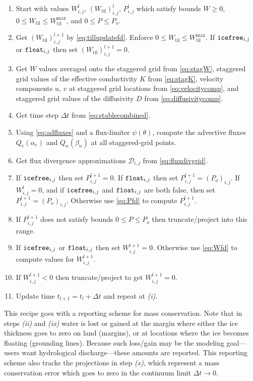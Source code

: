 \documentclass[gmd]{copernicus}   %
\newcommand{\text}{\textrm}
\newcommand{\Wtil}{W_{\text{til}}}
\newcommand{\Wtilmax}{W_{\text{til}}^{\text{max}}}
\newcommand{\Wlij}{W^l_{i,j}}
\newcommand{\Plij}{P^l_{i,j}}
\begin{document}
\renewcommand{\labelenumi}{\emph{(\roman{enumi})}}
\begin{enumerate}
\item Start with values $\Wlij$, $(\Wtil)_{i,j}^l$, $\Plij$ which satisfy bounds $W\ge 0$, $0\le \Wtil \le \Wtilmax$, and $0 \le P \le P_o$.
\item Get $(\Wtil)_{i,j}^{l+1}$ by \eqref{eq:tillupdatefd}.  Enforce $0\le \Wtil \le \Wtilmax$.  If $\text{\texttt{icefree}}_{i,j}$ or $\text{\texttt{float}}_{i,j}$ then set $(\Wtil)_{i,j}^{l+1}=0$.
\item Get $W$ values averaged onto the staggered grid from \eqref{eq:stagW}, staggered grid values of the effective conductivity $K$ from \eqref{eq:stagK}, velocity components $u$, $v$ at staggered grid locations from \eqref{eq:velocitycomp}, and staggered grid values of the diffusivity $D$ from \eqref{eq:diffusivitycomp}.
\item Get time step $\Delta t$ from \eqref{eq:stablecombined}.
\item Using \eqref{eq:adfluxes} and a flux-limiter $\psi(\theta)$, compute the advective fluxes $Q_e(\alpha_e)$ and $Q_n(\beta_n)$ at all staggered-grid points.
\item Get flux divergence approximations $\mathcal{D}_{i,j}$ from \eqref{eq:fluxdivgrid}.
\item If $\text{\texttt{icefree}}_{i,j}$ then set $P_{i,j}^{l+1}=0$.  If $\text{\texttt{float}}_{i,j}$ then set $P_{i,j}^{l+1} = (P_o)_{i,j}$.  If $\Wlij=0$, and if $\text{\texttt{icefree}}_{i,j}$ and $\text{\texttt{float}}_{i,j}$ are both false, then set $P_{i,j}^{l+1} = (P_o)_{i,j}$.  Otherwise use \eqref{eq:Pfd} to compute $P_{i,j}^{l+1}$.
\item If $P_{i,j}^{l+1}$ does not satisfy bounds $0 \le P \le P_o$ then truncate/project into this range.
\item If $\text{\texttt{icefree}}_{i,j}$ or $\text{\texttt{float}}_{i,j}$ then set $W_{i,j}^{l+1}=0$.  Otherwise use \eqref{eq:Wfd} to compute values for $W_{i,j}^{l+1}$.
\item If $W_{i,j}^{l+1}<0$ then truncate/project to get $W_{i,j}^{l+1}=0$.
\item Update time $t_{l+1}=t_l+\Delta t$ and repeat at \emph{(i)}.
\end{enumerate}

\medskip
This recipe goes with a reporting scheme for mass conservation.  Note that in steps \emph{(ii)} and \emph{(ix)} water is lost or gained at the margin where either the ice thickness goes to zero on land (margins), or at locations where the ice becomes floating (grounding lines).  Because such loss/gain may be the modeling goal---users want hydrological discharge---these amounts are reported.  This reporting scheme also tracks the projections in step \emph{(x)}, which represent a mass conservation error which goes to zero in the continuum limit $\Delta t\to 0$.
\end{document}
